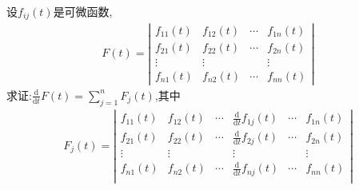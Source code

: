 \documentclass[../../main.tex]{subfiles}%
\begin{document}
\begin{proposition}[行列式的求导运算]\label{proposition:行列式的求导运算}
设\(f_{ij}(t)\)是可微函数,
\begin{align*}
F(t) = 
\left| \begin{matrix}
f_{11}(t) & f_{12}(t) & \cdots & f_{1n}(t) \\
f_{21}(t) & f_{22}(t) & \cdots & f_{2n}(t) \\
\vdots & \vdots &  & \vdots \\
f_{n1}(t) & f_{n2}(t) & \cdots & f_{nn}(t)
\end{matrix} \right| 
\nonumber
\end{align*}
求证:$\frac{\mathrm{d}}{\mathrm{d}t}F\left( t \right) =\sum_{j=1}^n{F_j\left( t \right)}$,其中
\begin{align*}
F_{j}(t) = 
\left| \begin{matrix}
f_{11}(t)&		f_{12}(t)&		\cdots&		\frac{\mathrm{d}}{\mathrm{d}t}f_{1j}(t)&		\cdots&		f_{1n}(t)\\
f_{21}(t)&		f_{22}(t)&		\cdots&		\frac{\mathrm{d}}{\mathrm{d}t}f_{2j}(t)&		\cdots&		f_{2n}(t)\\
\vdots&		\vdots&		&		\vdots&		&		\vdots\\
f_{n1}(t)&		f_{n2}(t)&		\cdots&		\frac{\mathrm{d}}{\mathrm{d}t}f_{nj}(t)&		\cdots&		f_{nn}(t)\\
\end{matrix} \right| 
\nonumber
\end{align*}
\end{proposition}
\end{document}
